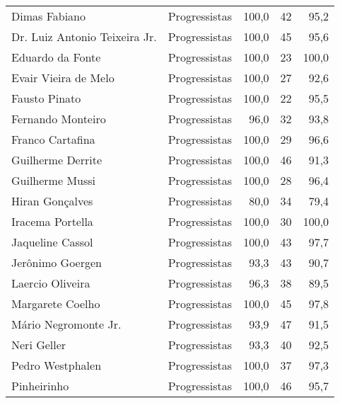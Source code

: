 \begin{longtable}{llrrr}
                       Dimas Fabiano &  Progressistas &     100,0 &           42 &       95,2 \\
       Dr. Luiz Antonio Teixeira Jr. &  Progressistas &     100,0 &           45 &       95,6 \\
                    Eduardo da Fonte &  Progressistas &     100,0 &           23 &      100,0 \\
                Evair Vieira de Melo &  Progressistas &     100,0 &           27 &       92,6 \\
                       Fausto Pinato &  Progressistas &     100,0 &           22 &       95,5 \\
                   Fernando Monteiro &  Progressistas &      96,0 &           32 &       93,8 \\
                    Franco Cartafina &  Progressistas &     100,0 &           29 &       96,6 \\
                   Guilherme Derrite &  Progressistas &     100,0 &           46 &       91,3 \\
                     Guilherme Mussi &  Progressistas &     100,0 &           28 &       96,4 \\
                     Hiran Gonçalves &  Progressistas &      80,0 &           34 &       79,4 \\
                    Iracema Portella &  Progressistas &     100,0 &           30 &      100,0 \\
                    Jaqueline Cassol &  Progressistas &     100,0 &           43 &       97,7 \\
                    Jerônimo Goergen &  Progressistas &      93,3 &           43 &       90,7 \\
                    Laercio Oliveira &  Progressistas &      96,3 &           38 &       89,5 \\
                    Margarete Coelho &  Progressistas &     100,0 &           45 &       97,8 \\
                Mário Negromonte Jr. &  Progressistas &      93,9 &           47 &       91,5 \\
                         Neri Geller &  Progressistas &      93,3 &           40 &       92,5 \\
                    Pedro Westphalen &  Progressistas &     100,0 &           37 &       97,3 \\
                         Pinheirinho &  Progressistas &     100,0 &           46 &       95,7 \\

\end{longtable}
